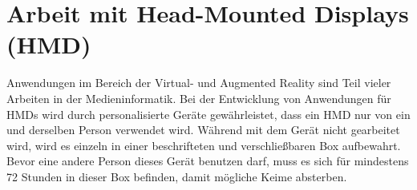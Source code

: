\section{Arbeit mit Head-Mounted Displays (HMD)}

Anwendungen im Bereich der Virtual- und Augmented Reality sind Teil vieler Arbeiten in der Medieninformatik.
Bei der Entwicklung von Anwendungen für HMDs wird durch personalisierte Geräte gewährleistet, dass ein HMD nur von ein und derselben Person verwendet wird.
Während mit dem Gerät nicht gearbeitet wird, wird es einzeln in einer beschrifteten und verschließbaren Box aufbewahrt.
Bevor eine andere Person dieses Gerät benutzen darf, muss es sich für mindestens 72 Stunden in dieser Box befinden, damit mögliche Keime absterben.
